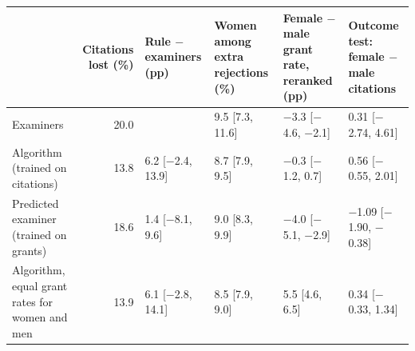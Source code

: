 \begin{tabular}{lrllll}
\toprule
 & Citations lost (\%) & Rule $-$ examiners (pp) & Women among extra rejections (\%) & Female $-$ male grant rate, reranked (pp) & Outcome test: female $-$ male citations \\
\midrule
Examiners & 20.0 &  & 9.5 [7.3, 11.6] & $-$3.3 [$-$4.6, $-$2.1] & 0.31 [$-$2.74, 4.61] \\
Algorithm (trained on citations) & 13.8 & 6.2 [$-$2.4, 13.9] & 8.7 [7.9, 9.5] & $-$0.3 [$-$1.2, 0.7] & 0.56 [$-$0.55, 2.01] \\
Predicted examiner (trained on grants) & 18.6 & 1.4 [$-$8.1, 9.6] & 9.0 [8.3, 9.9] & $-$4.0 [$-$5.1, $-$2.9] & $-$1.09 [$-$1.90, $-$0.38] \\
Algorithm, equal grant rates for women and men & 13.9 & 6.1 [$-$2.8, 14.1] & 8.5 [7.9, 9.0] & 5.5 [4.6, 6.5] & 0.34 [$-$0.33, 1.34] \\
\bottomrule
\end{tabular}
